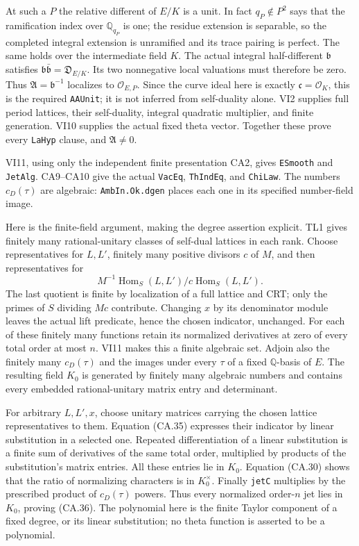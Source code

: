 At such a $P$ the relative different of $E/K$ is a unit.
In fact $q_P\notin P^2$ says that the ramification index over
$\mathbb Q_{q_P}$ is one; the residue extension is separable,
so the completed integral extension is unramified and its trace
pairing is perfect. The same holds over the intermediate field
$K$. The actual integral half-different $\mathfrak b$ satisfies
$\mathfrak b\bar{\mathfrak b}=\mathfrak D_{E/K}$.
Its two nonnegative local valuations must therefore be zero.
Thus $\mathfrak A=\mathfrak b^{-1}$ localizes to
$\mathcal O_{E,P}$. Since the curve ideal here is exactly
$\mathfrak c=\mathcal O_K$, this is the required
\texttt{AAUnit}; it is not inferred from self-duality alone.
VI2 supplies full period lattices, their self-duality, integral
quadratic multiplier, and finite generation. VI10 supplies the
actual fixed theta vector. Together these prove every
\texttt{LaHyp} clause, and $\mathfrak A\ne0$.

VI11, using only the independent finite presentation CA2, gives
\texttt{ESmooth} and \texttt{JetAlg}. CA9--CA10 give the actual
\texttt{VacEq}, \texttt{ThIndEq}, and \texttt{ChiLaw}.
The numbers $c_D(\tau)$ are algebraic: \texttt{AmbIn.Ok.dgen}
places each one in its specified number-field image.

Here is the finite-field argument, making the degree assertion
explicit. TL1 gives finitely many rational-unitary classes of
self-dual lattices in each rank. Choose representatives for
$L,L'$, finitely many positive divisors $c$ of $M$, and then
representatives for
\[
 M^{-1}\operatorname{Hom}_S(L,L')/
                    c\operatorname{Hom}_S(L,L').
 \tag{CA.37}
\]
The last quotient is finite by localization of a full lattice
and CRT; only the primes of $S$ dividing $Mc$ contribute.
Changing $x$ by its denominator module leaves the actual lift
predicate, hence the chosen indicator, unchanged.
For each of these finitely many functions retain its normalized
derivatives at zero of every total order at most $n$.
VI11 makes this a finite algebraic set. Adjoin also the finitely
many $c_D(\tau)$ and the images under every $\tau$ of a fixed
$\mathbb Q$-basis of $E$. The resulting field $K_0$ is generated
by finitely many algebraic numbers and contains every embedded
rational-unitary matrix entry and determinant.

For arbitrary $L,L',x$, choose unitary matrices carrying the
chosen lattice representatives to them. Equation (CA.35)
expresses their indicator by linear substitution in a selected
one. Repeated differentiation of a linear substitution is a
finite sum of derivatives of the same total order, multiplied
by products of the substitution's matrix entries. All these
entries lie in $K_0$. Equation (CA.30) shows that the ratio of
normalizing characters is in $K_0^\times$. Finally
\texttt{jetC} multiplies by the prescribed product of
$c_D(\tau)$ powers. Thus every normalized order-$n$ jet lies
in $K_0$, proving (CA.36). The polynomial here is the finite
Taylor component of a fixed degree, or its linear substitution;
no theta function is asserted to be a polynomial.

